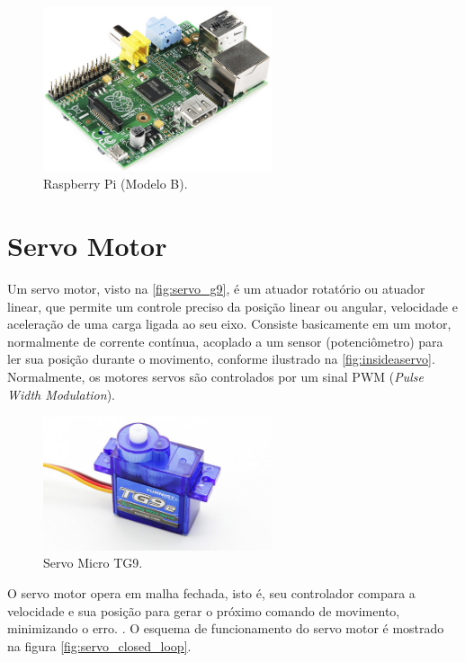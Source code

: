 \begin{figure}[H]
	\centering
	\includegraphics[width=0.6\textwidth]{figuras/raspberrypi_model_b.jpg}
	\caption{Raspberry Pi (Modelo B).}
	\label{fig:raspi_modelb}
\end{figure}

\section{Servo Motor}
\label{sec:servomotor}

Um servo motor, visto na \autoref{fig:servo_g9}, é um atuador rotatório ou atuador linear, que permite um controle preciso da posição linear ou angular, velocidade e aceleração de uma carga ligada ao seu eixo. Consiste basicamente em um motor, normalmente de corrente contínua, acoplado a um sensor (potenciômetro) para ler sua posição durante o movimento, conforme ilustrado na \autoref{fig:insideaservo}. Normalmente, os motores servos são controlados por um sinal PWM (\textit{Pulse Width Modulation}).  \par

\begin{figure}[h]
	\centering
	\includegraphics[width=0.6\textwidth]{figuras/servo_g9.jpg}
	\caption{Servo Micro TG9.}
	\label{fig:servo_g9}
\end{figure}

O servo motor opera em malha fechada, isto é, seu controlador compara a velocidade e sua posição para gerar o próximo comando de movimento, minimizando o erro. . O esquema de funcionamento do servo motor é mostrado na figura \autoref{fig:servo_closed_loop}. 

